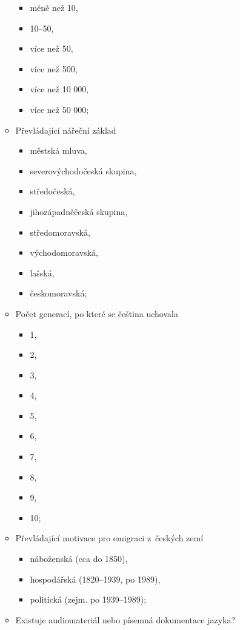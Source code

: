 \begin{itemize}
\begin{itemize}
    \begin{itemize}
    \tightlist
    \item
      méně než 10,
    \item
      10--50,
    \item
      více než 50,
    \item
      více než 500,
    \item
      více než 10 000,
    \item
      více než 50 000;
    \end{itemize}
  \item
    Převládající nářeční základ

    \begin{itemize}
    \tightlist
    \item
      městská mluva,
    \item
      severovýchodočeská skupina,
    \item
      středočeská,
    \item
      jihozápadněčeská skupina,
    \item
      středomoravská,
    \item
      východomoravská,
    \item
      lašská,
    \item
      českomoravská;
    \end{itemize}
  \item
    Počet generací, po které se čeština uchovala

    \begin{itemize}
    \tightlist
    \item
      1,
    \item
      2,
    \item
      3,
    \item
      4,
    \item
      5,
    \item
      6,
    \item
      7,
    \item
      8,
    \item
      9,
    \item
      10;
    \end{itemize}
  \item
    Převládající motivace pro emigraci z~českých zemí

    \begin{itemize}
    \tightlist
    \item
      náboženská (cca do 1850),
    \item
      hospodářská (1820--1939, po 1989),
    \item
      politická (zejm. po 1939--1989);
    \end{itemize}
  \item
    Existuje audiomateriál nebo písemná dokumentace jazyka?


\end{itemize}
\end{itemize}
